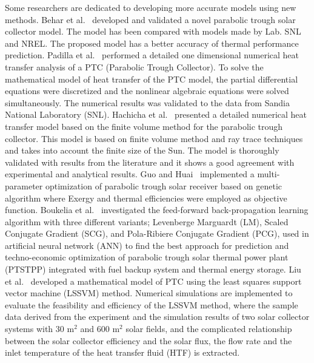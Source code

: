 Some researchers are dedicated to developing more accurate models using new methods. Behar et al.~\cite{Behar2015} developed and validated a novel parabolic trough solar collector model. The model has been compared with models made by Lab. SNL and NREL. The proposed model has a better accuracy of thermal performance prediction.
Padilla et al.~\cite{Padilla2011} performed a detailed one dimensional numerical heat transfer analysis of a PTC (Parabolic Trough Collector). To solve the mathematical model of heat transfer of the PTC model, the partial differential equations were discretized and the nonlinear algebraic equations were solved simultaneously. The numerical results was validated to the data from Sandia National Laboratory (SNL).
Hachicha et al.~\cite{Hachicha2013} presented a detailed numerical heat transfer model based on the finite volume method for the parabolic trough collector.  This model is based on finite volume method and ray trace techniques and takes into account the finite size of the Sun.  The model is thoroughly validated with results from the literature and it shows a good agreement with experimental and analytical results.
Guo and Huai~\cite{JiangfengGuo2016-2} implemented a multi-parameter optimization of parabolic trough solar receiver based on genetic algorithm where Exergy and thermal efficiencies were employed as objective function.
Boukelia et al.~\cite{Boukelia2016} investigated the feed-forward back-propagation learning algorithm with three different variants; Levenberge Marguardt (LM), Scaled Conjugate Gradient (SCG), and Pola-Ribiere Conjugate Gradient (PCG), used in artificial neural network (ANN) to find the best approach for prediction and techno-economic optimization of parabolic trough solar thermal power plant (PTSTPP) integrated with fuel backup system and thermal energy storage.
Liu et al.~\cite{Liu2012} developed a mathematical model of PTC using the least squares support vector machine (LSSVM) method. Numerical simulations are implemented to evaluate the feasibility and efficiency of the LSSVM method, where the sample data derived from the experiment and the simulation results of two solar collector systems with 30 m$^2$ and 600 m$^2$ solar fields, and the complicated relationship between the solar collector efficiency and the solar flux, the flow rate and the inlet temperature of the heat transfer fluid (HTF) is extracted.
